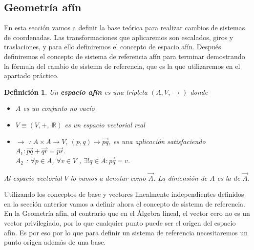 \documentclass[a4paper,11pt, oneside]{book}
\newtheorem{defi}{Definición}
\begin{document}
\subsection{Geometría afín}

En esta sección vamos a definir la base teórica para realizar cambios de sistemas de coordenadas. Las transformaciones que aplicaremos son escalados, giros y traslaciones, y para ello definiremos el concepto de espacio afín. Después definiremos el concepto de sistema de referencia afín para terminar demostrando la fórmula del cambio de sistema de referencia, que es la que utilizaremos en el apartado práctico. \cite{geometria}

\begin{defi}
	Un \textbf{espacio afín} es una tripleta $(A, V, \rightarrow)$ donde
	\begin{itemize}
		\item $A$ es un conjunto no vacío
		\item $V \equiv (V, +, \cdot \mathbb R)$ es un espacio vectorial real
		\item $\rightarrow$ : $A \times A \rightarrow V$, $(p,q) \mapsto \overrightarrow{pq}$, es una aplicación satisfaciendo \\
		$A_1 : \overrightarrow{pq} + \overrightarrow{qr} = \overrightarrow{pr}$.  \\
		$A_2$ : $\forall p \in A$, $\forall v \in V$ , $\exists! q \in A : \overrightarrow{pq} = v$.
	\end{itemize}
	Al espacio vectorial $V$ lo vamos a denotar como $\overrightarrow{A}$. La dimensión de $A$ es la de $\overrightarrow{A}$.
\end{defi}

Utilizando los conceptos de base y vectores linealmente independientes definidos en la sección anterior vamos a definir ahora el concepto de sistema de referencia. En la Geometría afín, al contrario que en el Álgebra lineal, el vector cero no es un vector privilegiado, por lo que cualquier punto puede ser el origen del espacio afín. Es por eso por lo que para definir un sistema de referencia necesitaremos un punto origen además de una base.
\end{document}
